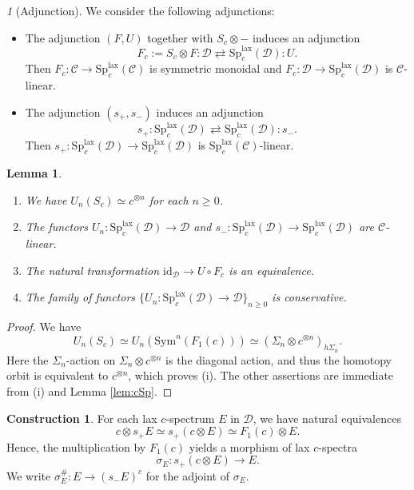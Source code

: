 \documentclass{amsart}
\theoremstyle{plain}
\newtheorem{lemma}[theorem]{Lemma}
\theoremstyle{definition}
\newtheorem{construction}[theorem]{Construction}
\theoremstyle{remark}
\newtheorem{p}[theorem]{}
\numberwithin{equation}{theorem}
\newcommand{\mcal}[1]{\mathcal{#1}}
\newcommand{\Sp}{\mathrm{Sp}}
\newcommand{\Sym}{\mathrm{Sym}}
\newcommand{\id}{\mathrm{id}}
\newcommand{\lax}{\mathrm{lax}}
\begin{document}
\begin{p}[Adjunction]\label{p:cSp}
We consider the following adjunctions:
\begin{itemize}[label={---},leftmargin=*]
\item The adjunction $(F,U)$ together with $S_c\otimes-$ induces an adjunction
\[
	F_c := S_c\otimes F \colon \mcal{D} \rightleftarrows \Sp^\lax_c(\mcal{D}) \colon U.
\]
Then $F_c\colon\mcal{C}\to\Sp^\lax_c(\mcal{C})$ is symmetric monoidal and $F_c\colon\mcal{D}\to\Sp^\lax_c(\mcal{D})$ is $\mcal{C}$-linear.
\item The adjunction $(s_+,s_-)$ induces an adjunction 
\[
	s_+ \colon \Sp^\lax_c(\mcal{D}) \rightleftarrows \Sp^\lax_c(\mcal{D}) \colon s_-.
\]
Then $s_+\colon\Sp^\lax_c(\mcal{D})\to\Sp^\lax_c(\mcal{D})$ is $\Sp^\lax_c(\mcal{C})$-linear.
\end{itemize}
\end{p}

\begin{lemma}\label{lem:cSp2}
\leavevmode
\begin{enumerate}
\item We have $U_n(S_c)\simeq c^{\otimes n}$ for each $n\ge 0$.
\item The functors $U_n\colon\Sp^\lax_c(\mcal{D})\to\mcal{D}$ and $s_-\colon\Sp^\lax_c(\mcal{D})\to\Sp^\lax_c(\mcal{D})$ are $\mcal{C}$-linear.
\item The natural transformation $\id_\mcal{D}\to U\circ F_c$ is an equivalence.
\item The family of functors $\{U_n\colon\Sp^\lax_c(\mcal{D})\to\mcal{D}\}_{n\ge 0}$ is conservative.
\end{enumerate}
\end{lemma}
\begin{proof}
We have
\[
	U_n(S_c) \simeq U_n(\Sym^n(F_1(c))) \simeq (\Sigma_n\otimes c^{\otimes n})_{h\Sigma_n}.
\]
Here the $\Sigma_n$-action on $\Sigma_n\otimes c^{\otimes n}$ is the diagonal action, and thus the homotopy orbit is equivalent to $c^{\otimes n}$, which proves (i). 
The other assertions are immediate from (i) and Lemma \ref{lem:cSp}.
\end{proof}

\begin{construction}\label{cons:cSp2}
For each lax $c$-spectrum $E$ in $\mcal{D}$, we have natural equivalences
\[
	c\otimes s_+E \simeq s_+(c\otimes E) \simeq F_1(c)\otimes E.
\]
Hence, the multiplication by $F_1(c)$ yields a morphism of lax $c$-spectra
\[
	\sigma_E \colon s_+(c\otimes E) \to E.
\]
We write $\sigma^\#_E\colon E\to (s_-E)^c$ for the adjoint of $\sigma_E$.
\end{construction}
\end{document}
